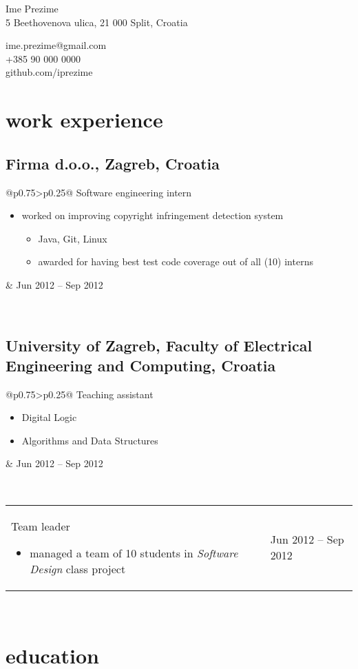 \documentclass[a4paper]{article}
\makeatletter
\newlength{\tablewidth}
\newenvironment{period}[2]{%
\newcommand{\sarma}{#2}%
\setlength{\tablewidth}{\linewidth}
\addtolength{\tablewidth}{-2\tabcolsep}
\begin{tabular}{@{}p{0.75\tablewidth}>{\raggedleft\arraybackslash}p{0.25\tablewidth}@{}}%
#1 \newline
\begin{itemize}
}{%
\end{itemize} & \sarma \\%
\end{tabular}\\
}
\makeatother
\begin{document}
\fontfamily{\sfdefault}
\selectfont

\begin{minipage}{.5\textwidth}
\LARGE{Ime Prezime}\\
\normalsize{5 Beethovenova ulica, 21 000 Split, Croatia}
\end{minipage}%
\begin{minipage}{.5\textwidth}
\raggedleft
ime.prezime@gmail.com \\
+385 90 000 0000 \\
github.com/iprezime
\end{minipage}

\vspace{1em}

\section{work experience}
\subsection{Firma d.o.o., Zagreb, Croatia}
\begin{period}{Software engineering intern}{Jun 2012 -- Sep 2012}
    \item 
        worked on improving copyright infringement detection system
        \begin{itemize}
            \item Java, Git, Linux
            \item awarded for having best test code coverage out of all (10) interns
        \end{itemize}
\end{period}
\subsection{University of Zagreb, Faculty of Electrical Engineering and Computing, Croatia}
\begin{period}{Teaching assistant}{Oct 2008 -- May 2009}
    \item Digital Logic
    \item Algorithms and Data Structures
\end{period}
\begin{period}{Team leader}{Sep 2011 -- Jan 2012}
    \item managed a team of 10 students in \textit{Software Design} class project
\end{period}

\section{education}
\end{document}

